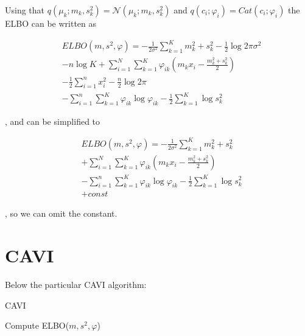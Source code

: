 \documentclass{article}
\begin{document}
Using that $q(\mu_{k}; m_{k}, s_{k}^{2}) = \mathcal{N}(\mu_{k};m_{k}, s_{k}^{2})$ and $q(c_{i};\varphi_{i})=Cat(c_{i};\varphi_{i})$ the ELBO can be written as

\begin{align}
    &ELBO(m, s^{2}, \varphi) = -\frac{1}{2\sigma^{2}}\sum_{k=1}^{K} m_{k}^{2}+s_{k}^{2}-\frac{1}{2}\log 2\pi\sigma^{2}\\
    &-n\log K+\sum_{i=1}^{N}\sum_{k=1}^{K}\varphi_{ik}(m_{k}x_{i}-\frac{m_{k}^{2}+s_{k}^{2}}{2})\\
    &-\frac{1}{2}\sum_{i=1}^{n}x_{i}^{2}-\frac{n}{2}\log 2\pi \\
    &-\sum_{i=1}^{n}\sum_{k=1}^{K}\varphi_{ik}\log \varphi_{ik}-\frac{1}{2}\sum_{k=1}^{K}\log s_{k}^{2}
\end{align}

, and can be simplified to 

\begin{align}
    &ELBO(m, s^{2}, \varphi) = -\frac{1}{2\sigma^{2}}\sum_{k=1}^{K} m_{k}^{2}+s_{k}^{2}\\
    &+\sum_{i=1}^{N}\sum_{k=1}^{K}\varphi_{ik}(m_{k}x_{i}-\frac{m_{k}^{2}+s_{k}^{2}}{2})\\
    &-\sum_{i=1}^{n}\sum_{k=1}^{K}\varphi_{ik}\log \varphi_{ik}-\frac{1}{2}\sum_{k=1}^{K}\log s_{k}^{2}\\
    &+const
\end{align}

, so we can omit the constant.

\section{CAVI}

Below the particular CAVI algorithm:

\begin{algorithm}[H]
    \SetAlgoLined
     \caption{CAVI}
     Compute ELBO($m, s^{2}, \varphi$)
\end{algorithm}
\end{document}
